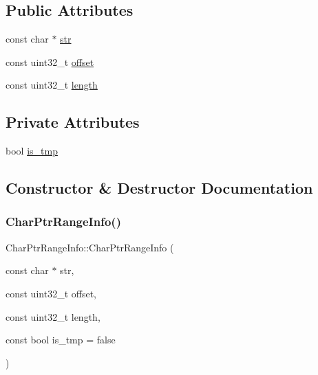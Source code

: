 \subsection*{Public Attributes}
\begin{DoxyCompactItemize}
\item 
const char $\ast$ \mbox{\hyperlink{classlucene_1_1core_1_1analysis_1_1characterutil_1_1CharPtrRangeInfo_a353ede88ef69e0a7c11523fd7d419ef6}{str}}
\item 
const uint32\+\_\+t \mbox{\hyperlink{classlucene_1_1core_1_1analysis_1_1characterutil_1_1CharPtrRangeInfo_a9ac49265cf8865e7a935631243c7e9bd}{offset}}
\item 
const uint32\+\_\+t \mbox{\hyperlink{classlucene_1_1core_1_1analysis_1_1characterutil_1_1CharPtrRangeInfo_a816e4469bb018338dacaf8444c279688}{length}}
\end{DoxyCompactItemize}
\subsection*{Private Attributes}
\begin{DoxyCompactItemize}
\item 
bool \mbox{\hyperlink{classlucene_1_1core_1_1analysis_1_1characterutil_1_1CharPtrRangeInfo_ab54d53df8367d85ed226d19c187d6e28}{is\+\_\+tmp}}
\end{DoxyCompactItemize}


\subsection{Constructor \& Destructor Documentation}
\mbox{\label{classlucene_1_1core_1_1analysis_1_1characterutil_1_1CharPtrRangeInfo_a226d1ddc2c1996f0cd4fc6f2127f8196}} 
\subsubsection{\texorpdfstring{Char\+Ptr\+Range\+Info()}{CharPtrRangeInfo()}\hspace{0.1cm}{\footnotesize\ttfamily [1/3]}}
{\footnotesize\ttfamily Char\+Ptr\+Range\+Info\+::\+Char\+Ptr\+Range\+Info (\begin{DoxyParamCaption}\item[{const char $\ast$}]{str,  }\item[{const uint32\+\_\+t}]{offset,  }\item[{const uint32\+\_\+t}]{length,  }\item[{const bool}]{is\+\_\+tmp = {\ttfamily false} }\end{DoxyParamCaption})}

